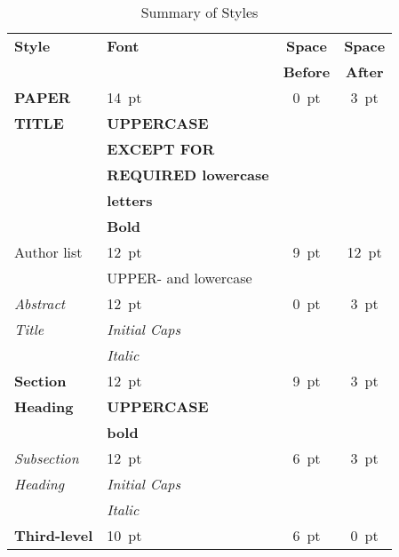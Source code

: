 \documentclass[letterpaper,  %
              ]{jacow-2_3}   %
\begin{document}
{{\begin{table}[h!t]
	\setlength\tabcolsep{3.5pt}
	\centering
	\caption{Summary of Styles}
	\label{style-tab}
	\begin{tabular}{llcc}
		\toprule
		\textbf{Style} & \textbf{Font}               & \textbf{Space}  & \textbf{Space} \\
		&                             & \textbf{Before} & \textbf{After} \\
		\midrule
		\textbf{PAPER}  & \SI{14}{pt}                 & \SI{0}{pt}      & \SI{3}{pt}  \\
		\textbf{TITLE}  & \textbf{UPPERCASE}          &                 &      \\
		& \textbf{EXCEPT FOR}         &                 &      \\
		& \textbf{REQUIRED lowercase} &                 &      \\
		& \textbf{letters}            &                 &      \\
		& \textbf{Bold}               &                 &      \\[5pt]
		Author list  & \SI{12}{pt}                 & \SI{9}{pt}      & \SI{12}{pt} \\
		& UPPER- and lowercase        &                 &      \\[5pt]
		\textit{Abstract} & \SI{12}{pt}                 & \SI{0}{pt}      & \SI{3}{pt} \\
		\textit{Title}  & \textit{Initial Caps}       &                 &      \\
		& \textit{Italic}             &                 &      \\[5pt]
		\textbf{Section}  & \SI{12}{pt}                 & \SI{9}{pt}      & \SI{3}{pt}  \\
		\textbf{Heading}  & \textbf{UPPERCASE}          &                 &      \\
		& \textbf{bold}               &                 &      \\[5pt]
		\textit{Subsection} & \SI{12}{pt}                 & \SI{6}{pt}      & \SI{3}{pt}  \\
		\textit{Heading}  & \textit{Initial Caps}       &                 &      \\
		& \textit{Italic}             &                 &      \\[5pt]
		\textbf{Third-level} & \SI{10}{pt}                 & \SI{6}{pt}      & \SI{0}{pt}  \\

\end{tabular}
\end{table}}}
\end{document}
